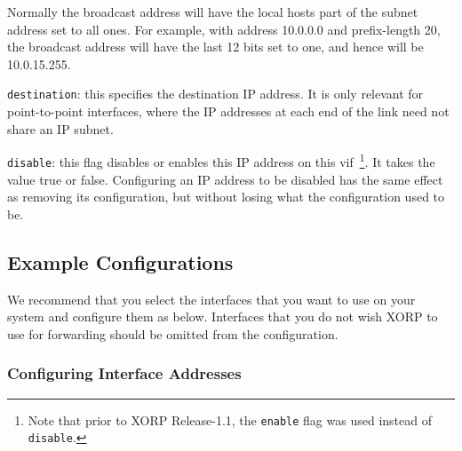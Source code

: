 \begin{description}
\begin{description}
\begin{description}
\begin{description}
  Normally the broadcast address will have the local hosts part of the
  subnet address set to all ones.  For example, with address 10.0.0.0
  and prefix-length 20, the broadcast address will have the last 12
  bits set to one, and hence will be 10.0.15.255.
\item{\tt destination}: this specifies the destination IP address.  It
  is only relevant for point-to-point interfaces, where the IP addresses
  at each end of the link need not share an IP subnet.
\item{\tt disable}: this flag disables or enables this IP address on
  this vif~\footnote{Note
  that prior to XORP Release-1.1, the {\tt enable} flag was used instead of
  {\tt disable}.}.
  It takes the value {\stt true} or {\stt false}.
  Configuring an IP address to be disabled has the same effect as removing its
  configuration, but without losing what the configuration used to be.
\end{description}
\end{description}
\end{description}
\end{description}

\newpage
\subsection{Example Configurations}

We recommend that you select the interfaces that you want to use on
your system and configure them as below.  Interfaces that you do not
wish XORP to use for forwarding should be omitted from the
configuration.

\subsubsection{Configuring Interface Addresses}

